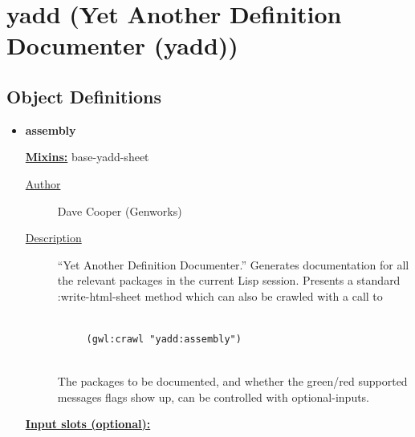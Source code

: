 \documentclass [11pt]{book}
\begin{document}
\section{yadd (Yet Another Definition Documenter (yadd))}

\label{sec:yadd(yetanotherdefinitiondocumenter(yadd))}





\subsection{Object Definitions}

\label{subsec:objectdefinitions}



\begin{itemize}

\item {}
\label{prim:assembly}
\textbf{assembly}


\textbf{
\underline{Mixins:}} base-yadd-sheet





\begin{description}

\item [
\underline{Author}]


Dave Cooper (Genworks)



\item [
\underline{Description}]


``Yet Another Definition Documenter.'' Generates 
documentation for all the relevant packages in the current Lisp session. Presents a 
standard :write-html-sheet method which can also be crawled with a call to 


\begin{verbatim}

     (gwl:crawl "yadd:assembly")


\end{verbatim}

The packages to be documented, and whether the green/red supported 
messages flags show up, can be controlled with optional-inputs.



\end{description}








\textbf{
\underline{Input slots (optional):}}


\end{itemize}
\end{document}
